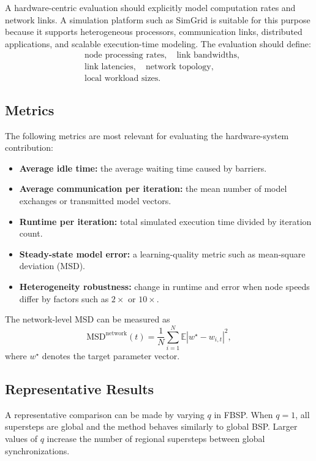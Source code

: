 ﻿\documentclass[10pt,journal]{IEEEtran}
\begin{document}
	A hardware-centric evaluation should explicitly model computation rates and network links. A simulation platform such as SimGrid is suitable for this purpose because it supports heterogeneous processors, communication links, distributed applications, and scalable execution-time modeling. The evaluation should define:
	\[
	\begin{aligned}
	&\text{node processing rates},\quad \text{link bandwidths},\\
	&\text{link latencies},\quad \text{network topology},\\
	&\text{local workload sizes}.
	\end{aligned}
	\]
	
	\subsection{Metrics}
	
	The following metrics are most relevant for evaluating the hardware-system contribution:
	
	\begin{itemize}
		\item \textbf{Average idle time:} the average waiting time caused by barriers.
		\item \textbf{Average communication per iteration:} the mean number of model exchanges or transmitted model vectors.
		\item \textbf{Runtime per iteration:} total simulated execution time divided by iteration count.
		\item \textbf{Steady-state model error:} a learning-quality metric such as mean-square deviation (MSD).
		\item \textbf{Heterogeneity robustness:} change in runtime and error when node speeds differ by factors such as $2\times$ or $10\times$.
	\end{itemize}
	
	The network-level MSD can be measured as
	\[
	\mathrm{MSD}^{\mathrm{network}}(t)
	=
	\frac{1}{N}
	\sum_{i=1}^{N}
	\mathbb{E}|w^\star-w_{i,t}|^2,
	\]
	where $w^\star$ denotes the target parameter vector.
	
	\subsection{Representative Results}
	
	A representative comparison can be made by varying $q$ in FBSP. When $q=1$, all supersteps are global and the method behaves similarly to global BSP. Larger values of $q$ increase the number of regional supersteps between global synchronizations.
	
\end{document}
